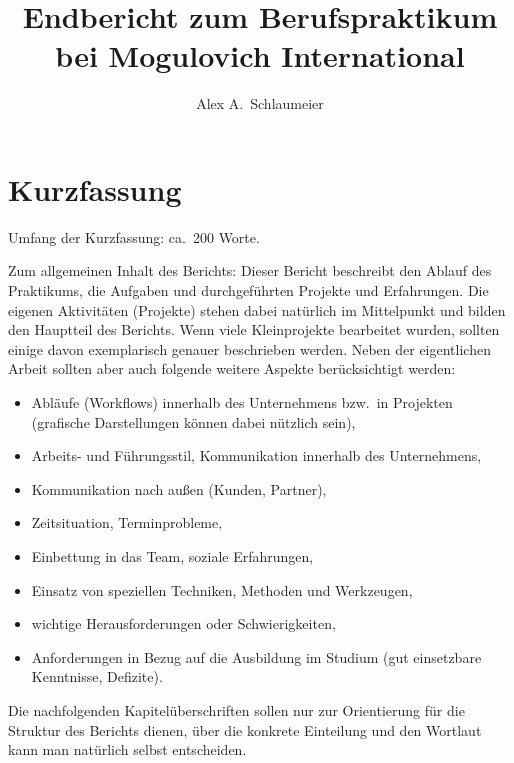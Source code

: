 \documentclass[internship,german,smartquotes]{hgbthesis}
\title{Endbericht zum Berufspraktikum bei Mogulovich International}
\author{Alex A.\ Schlaumeier}
\begin{document}

\frontmatter                                       %

\maketitle
\tableofcontents


\chapter{Kurzfassung}

Umfang der Kurzfassung: ca.\ 200 Worte.

Zum allgemeinen Inhalt des Berichts: Dieser Bericht beschreibt den Ablauf des
Praktikums, die Aufgaben und durchgeführten Projekte und Erfahrungen. Die
eigenen Aktivitäten (Projekte) stehen dabei natürlich im Mittelpunkt und bilden
den Hauptteil des Berichts. Wenn viele Kleinprojekte bearbeitet wurden, sollten
einige davon exemplarisch genauer beschrieben werden. Neben der eigentlichen
Arbeit sollten aber auch folgende weitere Aspekte berücksichtigt werden:
%
\begin{itemize}
	\item Abläufe (Workflows) innerhalb des Unternehmens bzw.\ in Projekten
	(grafische Darstellungen können dabei nützlich sein),
	\item Arbeits- und Führungsstil, Kommunikation innerhalb des Unternehmens,
	\item Kommunikation nach außen (Kunden, Partner),
	\item Zeitsituation, Terminprobleme,
	\item Einbettung in das Team, soziale Erfahrungen,
	\item Einsatz von speziellen Techniken, Methoden und Werkzeugen,
	\item wichtige Herausforderungen oder Schwierigkeiten,
	\item Anforderungen in Bezug auf die Ausbildung im Studium (gut
	einsetzbare Kenntnisse, Defizite).
\end{itemize}
%
Die nachfolgenden Kapitelüberschriften sollen nur zur Orientierung für die
Struktur des Berichts dienen, über die konkrete Einteilung und den Wortlaut
kann man natürlich selbst entscheiden.
\end{document}
